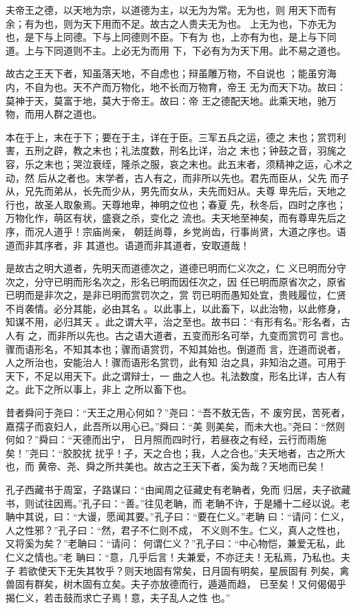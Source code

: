 \documentclass[a4paper,12pt,UTF8,twoside]{ctexbook}
\begin{document}
夫帝王之德，以天地为宗，以道德为主，以无为为常。无为也，则 用天下而有余；有为也，则为天下用而不足。故古之人贵夫无为也。 上无为也，下亦无为也，是下与上同德。下与上同德则不臣。下有为 也，上亦有为也，是上与下同道。上与下同道则不主。上必无为而用 下，下必有为为天下用。此不易之道也。

故古之王天下者，知虽落天地，不自虑也；辩虽雕万物，不自说也 ；能虽穷海内，不自为也。天不产而万物化，地不长而万物育，帝王 无为而天下功。故曰：莫神于天，莫富于地，莫大于帝王。故曰：帝 王之德配天地。此乘天地，驰万物，而用人群之道也。

本在于上，末在于下；要在于主，详在于臣。三军五兵之运，德之 末也；赏罚利害，五刑之辟，教之末也；礼法度数，刑名比详，治之 末也；钟鼓之音，羽旄之容，乐之末也；哭泣衰绖，隆杀之服，哀之末也。此五末者，须精神之运，心术之动，然 后从之者也。末学者，古人有之，而非所以先也。君先而臣从，父先 而子从，兄先而弟从，长先而少从，男先而女从，夫先而妇从。夫尊 卑先后，天地之行也，故圣人取象焉。天尊地卑，神明之位也；春夏 先，秋冬后，四时之序也；万物化作，萌区有状，盛衰之杀，变化之 流也。夫天地至神矣，而有尊卑先后之序，而况人道乎！宗庙尚亲， 朝廷尚尊，乡党尚齿，行事尚贤，大道之序也。语道而非其序者，非 其道也。语道而非其道者，安取道哉！

是故古之明大道者，先明天而道德次之，道德已明而仁义次之，仁 义已明而分守次之，分守已明而形名次之，形名已明而因任次之，因 任已明而原省次之，原省已明而是非次之，是非已明而赏罚次之，赏 罚已明而愚知处宜，贵贱履位，仁贤不肖袭情。必分其能，必由其名 。以此事上，以此畜下，以此治物，以此修身，知谋不用，必归其天 。此之谓大平，治之至也。故书曰：“有形有名。”形名者，古人有 之，而非所以先也。古之语大道者，五变而形名可举，九变而赏罚可 言也。骤而语形名，不知其本也；骤而语赏罚，不知其始也。倒道而 言，迕道而说者，人之所治也，安能治人！骤而语形名赏罚，此有知 治之具，非知治之道。可用于天下，不足以用天下。此之谓辩士，一 曲之人也。礼法数度，形名比详，古人有之。此下之所以事上，非上 之所以畜下也。

昔者舜问于尧曰：“天王之用心何如？”尧曰：“吾不敖无告，不 废穷民，苦死者，嘉孺子而哀妇人，此吾所以用心已。”舜曰：“美 则美矣，而未大也。”尧曰：“然则何如？”舜曰：“天德而出宁， 日月照而四时行，若昼夜之有经，云行而雨施矣！”尧曰：“胶胶扰 扰乎！子，天之合也；我，人之合也。”夫天地者，古之所大也，而 黄帝、尧、舜之所共美也。故古之王天下者，奚为哉？天地而已矣！

孔子西藏书于周室，子路谋曰：“由闻周之征藏史有老聃者，免而 归居，夫子欲藏书，则试往因焉。”孔子曰：“善。”往见老聃，而 老聃不许，于是繙十二经以说。老 聃中其说，曰：“大谩，愿闻其要。”孔子曰：“要在仁义。”老聃 曰：“请问：仁义，人之性邪？”孔子曰：“然，君子不仁则不成， 不义则不生。仁义，真人之性也，又将奚为矣？”老聃曰：“请问： 何谓仁义？”孔子曰：“中心物恺，兼爱无私，此仁义之情也。”老 聃曰：“意，几乎后言！夫兼爱，不亦迂夫！无私焉，乃私也。夫子 若欲使天下无失其牧乎？则天地固有常矣，日月固有明矣，星辰固有 列矣，禽兽固有群矣，树木固有立矣。夫子亦放德而行，遁遁而趋， 已至矣！又何偈偈乎揭仁义，若击鼓而求亡子焉！意，夫子乱人之性 也。”
\end{document}
